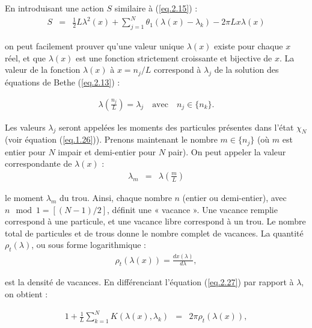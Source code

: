 \begin{enumerate}
    En introduisant une action \( S \) similaire à (\ref{eq.2.15}) :
    \begin{eqnarray}
    	S & = & \frac{1}{2} L  \lambda^2 (x) + \sum_{j=1}^N  \theta_1  ( \lambda(x) - \lambda_k )  - 2 \pi L x \lambda ( x) 	
    \end{eqnarray}

    

    on peut facilement prouver qu'une valeur unique \( \lambda(x) \) existe pour chaque \( x \) réel, et que \( \lambda(x) \) est une fonction strictement croissante et bijective de \( x \). La valeur de la fonction \( \lambda(x) \) à \( x = n_j / L \) correspond à \( \lambda_j \) de la solution des équations de Bethe (\ref{eq.2.13}) : 
    
    \begin{eqnarray}
    	\lambda\left( \frac{n_j}{L} \right) = \lambda_j \quad \text{avec} \quad n_j \in \{n_k\}.	
    \end{eqnarray}

\end{enumerate}

Les valeurs \( \lambda_j \) seront appelées les moments des particules présentes dans l'état \( \chi_N \) (voir équation (\ref{eq.1.26})). Prenons maintenant le nombre \( m \in \{n_j\} \) (où \( m \) est entier pour \( N \) impair et demi-entier pour \( N \) pair). On peut appeler la valeur correspondante de \( \lambda(x) \) :
\begin{eqnarray}
	\lambda_m  & = & \lambda \left ( \frac{m}{L}\right ) 	
\end{eqnarray}

le moment \( \lambda_m \) du trou. Ainsi, chaque nombre \( n \) (entier ou demi-entier), avec \( n \mod 1 = [(N - 1)/2] \), définit une « vacance ». Une vacance remplie correspond à une particule, et une vacance libre correspond à un trou. Le nombre total de particules et de trous donne le nombre complet de vacances. La quantité \( \rho_t(\lambda) \), ou sous forme logarithmique :
\begin{eqnarray}
	\rho_t(\lambda(x)) = \frac{d x(\lambda)}{d \lambda},	
\end{eqnarray}


est la densité de vacances. En différenciant l'équation (\ref{eq.2.27}) par rapport à \( \lambda \), on obtient :

\begin{eqnarray}
	1 + \frac{1}{L} \sum_{k=1}^N K(\lambda(x), \lambda_k)  & =  & 2 \pi \rho_t(\lambda(x)),		
\end{eqnarray}

